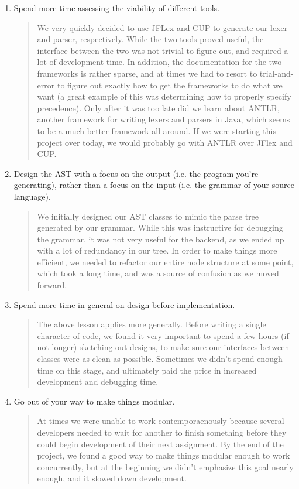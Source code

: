 \documentclass{report}
\begin{document}
\begin{enumerate}
\item Spend more time assessing the viability of different tools.
\begin{quotation}
\noindent We very quickly decided to use JFLex and CUP to generate our lexer and parser, respectively. While the two tools proved useful, the interface between the two was not trivial to
figure out, and required a lot of development time. In addition, the documentation for the two
frameworks is rather sparse, and at times we had to resort to trial-and-error to figure out
exactly how to get the frameworks to do what we want (a great example of this was determining
how to properly specify precedence). Only after it was too late did we learn about ANTLR, another framework for writing lexers and parsers in Java, which seems to be a much better framework all around. If we were starting this project over today, we would probably go with ANTLR over JFlex and CUP.  
\end{quotation}
\item Design the AST with a focus on the output (i.e. the program you're generating), rather than a focus on the input (i.e. the grammar of your source language).
\begin{quotation}
\noindent We initially designed our AST classes to mimic the parse tree generated by our
grammar. While this was instructive for debugging the grammar, it was not very useful for the backend, as we ended up with a lot of redundancy in our tree. In order to make things more efficient, we needed to refactor our entire node structure at some point, which took a long time, and was a source of confusion as we moved forward. 
\end{quotation}
\item Spend more time in general on design before implementation.
\begin{quotation}
\noindent The above lesson applies more generally. Before writing a single character of code,
we found it very important to spend a few hours (if not longer) sketching out designs, to make sure our interfaces between classes were as clean as possible. Sometimes we didn't spend enough time on this stage, and ultimately paid the price in increased development and debugging time. 
\end{quotation}
\item Go out of your way to make things modular.
\begin{quotation}
\noindent At times we were unable to work contemporaenously because several developers needed to wait for another to finish something before they could begin development of their next assignment. By the end of the project, we found a good way to make things modular enough to work concurrently, but at the beginning we didn't emphasize this goal nearly enough, and it slowed down development. 

\end{quotation}
\end{enumerate}
\end{document}
